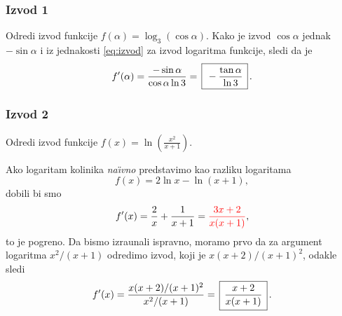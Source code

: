 \subsubsection{Izvod 1}

\zadatak Odredi izvod funkcije $f(\alpha)=\log_3(\cos\alpha)$.
\resenje Kako je izvod $\cos\alpha$ jednak $-\sin\alpha$ i iz jednakosti 
\eqref{eq:izvod} za izvod logaritma funkcije, sledi da je
$$
f'(\alpha)
=\frac{-\sin\alpha}{\cos\alpha\ln3}
=\ram{-\frac{\tan\alpha}{\ln3}}.
$$


\subsubsection{Izvod 2}

\zadatak Odredi izvod funkcije $\displaystyle {f(x)=\ln\left(\frac{x^2}{x+1}\right)}$.

\resenje Ako logaritam koli{\cv}nika {\sl na\"\i vno\/} predstavimo kao razliku logaritama
$$
f(x) = 2\ln x - \ln (x+1),
$$
dobili bi smo 
$$
f'(x) = \frac2x + \frac1{x+1} = {\color{red}\frac{3x+2}{x(x+1)}},
$$
{\sv}to je pogre{\sv}no. Da bismo izra{\cv}unali ispravno, moramo prvo da za argument
logaritma $x^2/(x+1)$ odredimo izvod, koji je $x(x+2)/(x+1)^2$, odakle sledi
$$
f'(x)=\frac{x(x+2)/(x+1)^2}{x^2/(x+1)}=\ram{\frac{x+2}{x(x+1)}}.
$$
